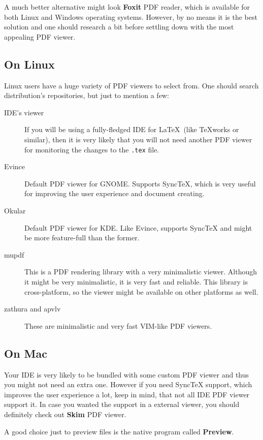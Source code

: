 A much better alternative might look \textbf{Foxit} PDF reader, which is
available for both Linux and Windows operating systems. However, by no means it
is the best solution and one should research a bit before settling down with the
most appealing PDF viewer.

\subsection{On Linux}

Linux users have a huge variety of PDF viewers to select from. One should search
distribution's repositories, but just to mention a few:
\begin{description}
    \item[IDE's viewer]
        If you will be using a fully-fledged IDE for \LaTeX\ (like
        \TeX{}works or similar), then it is very likely that you will not need
        another PDF viewer for monitoring the changes to the \verb|.tex| file.
    \item[Evince]
        Default PDF viewer for GNOME. Supports Sync\TeX{}, which is very useful
        for improving the user experience and document creating.
    \item[Okular] 
        Default PDF viewer for KDE. Like Evince, supports Sync\TeX{} and might
        be more feature-full than the former.
    \item[mupdf]
        This is a PDF rendering library with a very minimalistic viewer.
        Although it might be very minimalistic, it is very fast and reliable.
        This library is cross-platform, so the viewer might be available on
        other platforms as well.
    \item[zathura and apvlv]
        These are minimalistic and very fast VIM-like PDF viewers.
\end{description}

\subsection{On Mac}

Your IDE is very likely to be bundled with some custom PDF viewer and thus you
might not need an extra one. However if you need Sync\TeX{} support, which
improves the user experience a lot, keep in mind, that not all IDE PDF viewer
support it. In case you wanted the support in a external viewer, you should
definitely check out \textbf{Skim} PDF viewer.

A good choice just to preview files is the native program called
\textbf{Preview}.


